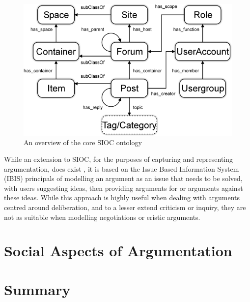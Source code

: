 \begin{figure}
\begin{center}
\includegraphics[scale=1.75]{./figures/ontologies/sioc.png}
\caption[An overview of the core SIOC ontology]{An overview of the core SIOC ontology\protect\footnotemark}
\label{figure:sioc}
\end{center}
\end{figure}

While an extension to SIOC, for the purposes of capturing and representing argumentation, does exist \citep{Lange2008}, it is based on the Issue Based Information System (IBIS) principals of modelling an argument as an issue that needs to be solved, with users suggesting ideas, then providing arguments for or arguments against these ideas. While this approach is highly useful when dealing with arguments centred around deliberation, and to a lesser extend criticism or inquiry, they are not as suitable when modelling negotiations or eristic arguments.

\section{Social Aspects of Argumentation}


\section{Summary}
